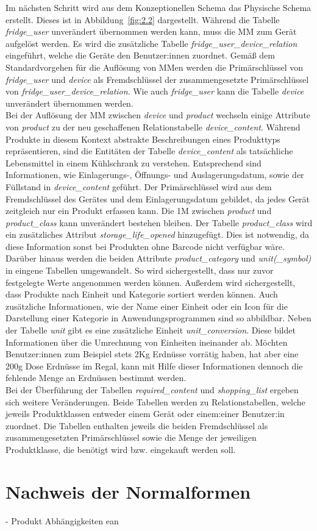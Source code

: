 Im nächsten Schritt wird aus dem Konzeptionellen Schema das Physische Schema erstellt. Dieses ist in Abbildung~\ref{fig:2.2} dargestellt. Während die Tabelle \textit{fridge\_user} unverändert übernommen werden kann, muss die \gls{MM} zum Gerät aufgelöst werden. Es wird die zusätzliche Tabelle \textit{fridge\_user\_device\_relation} eingeführt, welche die Geräte den Benutzer:innen zuordnet. Gemäß dem Standardvorgehen für die Auflösung von \gls{MM}en werden die Primärschlüssel von \textit{fridge\_user} und \textit{device} als Fremdschlüssel der zusammengesetzte Primärschlüssel von \textit{fridge\_user\_device\_relation}. Wie auch \textit{fridge\_user} kann die Tabelle \textit{device} unverändert übernommen werden.\\ Bei der Auflösung der \gls{MM} zwischen \textit{device} und \textit{product} wechseln einige Attribute von \textit{product} zu der neu geschaffenen Relationstabelle \textit{device\_content}. Während Produkte in diesem Kontext abstrakte Beschreibungen eines Produkttyps repräsentieren, sind die Entitäten der Tabelle \textit{device\_content} als tatsächliche Lebensmittel in einem Kühlschrank zu verstehen. Entsprechend sind Informationen, wie Einlagerungs-, Öffnungs- und Auslagerungsdatum, sowie der Füllstand in \textit{device\_content} geführt. Der Primärschlüssel wird aus dem Fremdschlüssel des Gerätes und dem Einlagerungsdatum gebildet, da jedes Gerät zeitgleich nur ein Produkt erfassen kann.
Die \gls{1M} zwischen \textit{product} und \textit{product\_class} kann unverändert bestehen bleiben. Der Tabelle \textit{product\_class} wird ein zusätzliches Attribut \textit{storage\_life\_opened} hinzugefügt. Dies ist notwendig, da diese Information sonst bei Produkten ohne Barcode nicht verfügbar wäre. Darüber hinaus werden die beiden Attribute \textit{product\_category} und \textit{unit(\_symbol)} in eingene Tabellen umgewandelt. So wird sichergestellt, dass nur zuvor festgelegte Werte angenommen werden können. Außerdem wird sichergestellt, dass Produkte nach Einheit und Kategorie sortiert werden können. Auch zusätzliche Informationen, wie der Name einer Einheit oder ein Icon für die Darstellung einer Kategorie in Anwendungsprogrammen sind so abbildbar. Neben der Tabelle \textit{unit} gibt es eine zusätzliche Einheit \textit{unit\_conversion}. Diese bildet Informationen über die Umrechnung von Einheiten ineinander ab. Möchten Benutzer:innen zum Beispiel stets 2Kg Erdnüsse vorrätig haben, hat aber eine 200g Dose Erdnüsse im Regal, kann mit Hilfe dieser Informationen dennoch die fehlende Menge an Erdnüssen bestimmt werden.\\ Bei der Überführung der Tabellen \textit{required\_content} und \textit{shopping\_list} ergeben sich weitere Veränderungen. Beide Tabellen werden zu Relationstabellen, welche jeweils Produktklassen entweder einem Gerät oder einem:einer Benutzer:in zuordnet. Die Tabellen enthalten jeweils die beiden Fremdschlüssel als zusammengesetzten Primärschlüssel sowie die Menge der jeweiligen Produktklasse, die benötigt wird bzw. eingekauft werden soll.

\section{Nachweis der Normalformen}\label{sec:Nachweis der Normalformen}

- Produkt Abhängigkeiten ean